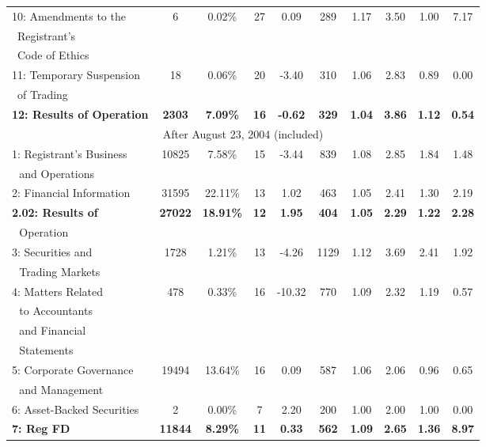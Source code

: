 \begin{table}[H]
\begin{center}
\begin{tabular}{lccccccccc}
  		10: Amendments to the & 6 & 0.02\% & 27 & 0.09 & 289 & 1.17 & 3.50 & 1.00 & 7.17 \\
  		\quad\:\, Registrant's & &  &  &  & & & & & \\
  		\quad\:\, Code of Ethics & &  &  &  & & & & & \\
  		11: Temporary Suspension & 18 & 0.06\% & 20 & -3.40 & 310 & 1.06 & 2.83 & 0.89 & 0.00 \\
  		\quad\:\, of Trading & &  &  &  & & & & & \\
  		\textbf{12: Results of Operation} & \textbf{2303} & \textbf{7.09\%} & \textbf{16} & \textbf{-0.62} & \textbf{329} & \textbf{1.04} & \textbf{3.86} & \textbf{1.12} & \textbf{0.54} \\
  		\midrule
  		\multicolumn{10}{c}{After August 23, 2004 (included)} \\
  		\midrule
  		1: Registrant's Business & 10825 & 7.58\% & 15 & -3.44 & 839 & 1.08 & 2.85 & 1.84 & 1.48 \\
  		\: \,\, and Operations & &  &  &  & & & & & \\
  		2: Financial Information & 31595 & 22.11\% & 13 & 1.02 & 463 & 1.05 & 2.41 & 1.30 & 2.19 \\
  		\textbf{2.02: Results of} & \textbf{27022} & \textbf{18.91\%} & \textbf{12} & \textbf{1.95} & \textbf{404} & \textbf{1.05} & \textbf{2.29} & \textbf{1.22} & \textbf{2.28} \\
  		\: \,\, Operation & &  &  &  & & & & & \\
  		3: Securities and & 1728 & 1.21\% & 13 & -4.26 & 1129 & 1.12 & 3.69 & 2.41 & 1.92 \\
  		\: \,\, Trading Markets & &  &  &  & & & & & \\
  		4: Matters Related & 478 & 0.33\% & 16 & -10.32 & 770 & 1.09 & 2.32 & 1.19 & 0.57 \\
  		\: \,\, to Accountants & &  &  &  & & & & & \\
  		\: \,\, and Financial & &  &  &  & & & & & \\
  		\: \,\, Statements & &  &  &  & & & & & \\
  		5: Corporate Governance & 19494 & 13.64\% & 16 & 0.09 & 587 & 1.06 & 2.06 & 0.96 & 0.65 \\
  		\: \,\, and Management & &  &  &  & & & & &  \\
  		6: Asset-Backed Securities & 2 & 0.00\% & 7 & 2.20 & 200 & 1.00 & 2.00 & 1.00 & 0.00 \\
  		\textbf{7: Reg FD} & \textbf{11844} & \textbf{8.29\%} & \textbf{11} & \textbf{0.33} & \textbf{562} & \textbf{1.09} & \textbf{2.65} & \textbf{1.36} & \textbf{8.97} \\

\end{tabular}
\end{center}
\end{table}
